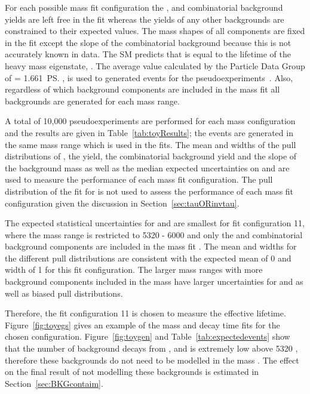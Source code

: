 For each possible mass fit configuration the \bsmumu, \bdmumu and combinatorial background yields are left free in the fit whereas the yields of any other backgrounds are constrained to their expected values. The mass shapes of all components are fixed in the \ml fit except the slope of the combinatorial background because this is not accurately known in data. 
The SM predicts that \tmumu is equal to the lifetime of the heavy \bs mass eigenstate, \tH. The average value calculated by the Particle Data Group of \tmumu = 1.661~\ps, is used to generated events for the pseudoexperiments~\cite{Olive:2016xmw}. %
Also, regardless of which background components are included in the mass fit all backgrounds are generated for each mass range. %

A total of 10,000 pseudoexperiments are performed for each mass configuration and the results are given in Table~\ref{tab:toyResults}; the events are generated in the same mass range which is used in the fits. The mean and widths of the pull distributions of \Gmumu, the \bsmumu yield, the combinatorial background yield and the slope of the background mass \pdf as well as the median expected uncertainties on \tmumu and \Gmumu are used to measure the performance of each mass fit configuration. The pull distribution of the fit for \tmumu is not used to assess the performance of each mass fit configuration given the discussion in Section~\ref{sec:tauORinvtau}.



The expected statistical uncertainties for \tmumu and \Gmumu are smallest for fit configuration 11, where the mass range is restricted to 5320 - 6000 \mevcc and only the \bsmumu and combinatorial background components are included in the mass fit \pdf. The mean and widths for the different pull distributions are consistent with the expected mean of 0 and width of 1 for this fit configuration. The larger mass ranges with more background components included in the mass \pdf have larger uncertainties for \tmumu and \Gmumu as well as biased pull distributions. %

Therefore, the fit configuration 11 is chosen to measure the \bsmumu effective lifetime. Figure~\ref{fig:toyegs} gives an example of the mass and decay time fits for the chosen configuration. Figure~\ref{fig:toygen} and Table~\ref{tab:expectedevents} show that the number of background decays from \bdmumu, \bhh and \lambdab is extremely low above 5320 \mevcc, therefore these backgrounds do not need to be modelled in the mass \pdf. The effect on the final result of not modelling these backgrounds is estimated in Section~\ref{sec:BKGcontaim}.


